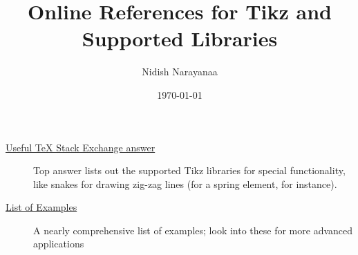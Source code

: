 \documentclass[11pt]{article}
\author{Nidish Narayanaa}
\date{\today}
\title{Online References for Tikz and Supported Libraries}
\begin{document}
\maketitle
\begin{description}
\item[{\href{https://tex.stackexchange.com/questions/42611/list-of-available-tikz-libraries-with-a-short-introduction/43038\#43038}{Useful \TeX{} Stack Exchange answer}}] Top answer lists out the
supported Tikz libraries for special functionality, like snakes
for drawing zig-zag lines (for a spring element, for instance).
\item[{\href{http://www.texample.net/tikz/examples/}{List of Examples}}] A nearly comprehensive list of examples; look
into these for more advanced applications
\end{description}
\end{document}
